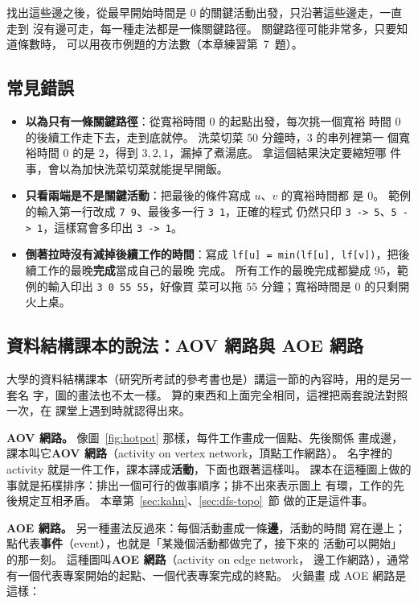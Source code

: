 找出這些邊之後，從最早開始時間是 $0$ 的關鍵活動出發，只沿著這些邊走，一直走到
沒有邊可走，每一種走法都是一條關鍵路徑。 關鍵路徑可能非常多，只要知道條數時，
可以用夜市例題的方法數（本章練習第~7~題）。

\subsection{常見錯誤}

\begin{itemize}
\item \textbf{以為只有一條關鍵路徑}：從寬裕時間 $0$ 的起點出發，每次挑一個寬裕
時間 $0$ 的後續工作走下去，走到底就停。 洗菜切菜 $50$ 分鐘時，$3$ 的串列裡第一
個寬裕時間 $0$ 的是 $2$，得到 $3, 2, 1$，漏掉了煮湯底。 拿這個結果決定要縮短哪
件事，會以為加快洗菜切菜就能提早開飯。
\item \textbf{只看兩端是不是關鍵活動}：把最後的條件寫成 $u$、$v$ 的寬裕時間都
是 $0$。 範例的輸入第一行改成 \texttt{7 9}、最後多一行 \texttt{3 1}，正確的程式
仍然只印 \texttt{3 -> 5}、\texttt{5 -> 1}，這樣寫會多印出
\texttt{3 -> 1}。
\item \textbf{倒著拉時沒有減掉後續工作的時間}：寫成
\texttt{lf[u] = min(lf[u], lf[v])}，把後續工作的最晚\textbf{完成}當成自己的最晚
完成。 所有工作的最晚完成都變成 $95$，範例的輸入印出 \texttt{3 0 55 55}，好像買
菜可以拖 $55$ 分鐘；寬裕時間是 $0$ 的只剩開火上桌。
\end{itemize}

\subsection{資料結構課本的說法：AOV 網路與 AOE 網路}
\label{sec:aov-aoe}

大學的資料結構課本（研究所考試的參考書也是）講這一節的內容時，用的是另一套名
字，圖的畫法也不太一樣。 算的東西和上面完全相同，這裡把兩套說法對照一次，在
課堂上遇到時就認得出來。

\textbf{AOV 網路。} 像圖~\ref{fig:hotpot} 那樣，每件工作畫成一個點、先後關係
畫成邊，課本叫它\textbf{AOV 網路}（activity on vertex network，頂點工作網路）。
名字裡的 activity 就是一件工作，課本譯成\textbf{活動}，下面也跟著這樣叫。
課本在這種圖上做的事就是拓樸排序：排出一個可行的做事順序；排不出來表示圖上
有環，工作的先後規定互相矛盾。 本章第~\ref{sec:kahn}、\ref{sec:dfs-topo}~節
做的正是這件事。

\textbf{AOE 網路。} 另一種畫法反過來：每個活動畫成一條\textbf{邊}，活動的時間
寫在邊上；點代表\textbf{事件}（event），也就是「某幾個活動都做完了，接下來的
活動可以開始」的那一刻。 這種圖叫\textbf{AOE 網路}（activity on edge network，
邊工作網路），通常有一個代表專案開始的起點、一個代表專案完成的終點。 火鍋畫
成 AOE 網路是這樣：

